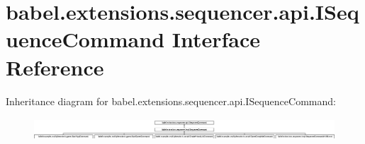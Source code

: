 \hypertarget{interfacebabel_1_1extensions_1_1sequencer_1_1api_1_1_i_sequence_command}{\section{babel.\-extensions.\-sequencer.\-api.\-I\-Sequence\-Command Interface Reference}
\label{interfacebabel_1_1extensions_1_1sequencer_1_1api_1_1_i_sequence_command}
}
Inheritance diagram for babel.\-extensions.\-sequencer.\-api.\-I\-Sequence\-Command\-:\begin{figure}[H]
\begin{center}
\leavevmode
\includegraphics[height=0.863753cm]{interfacebabel_1_1extensions_1_1sequencer_1_1api_1_1_i_sequence_command}
\end{center}
\end{figure}
